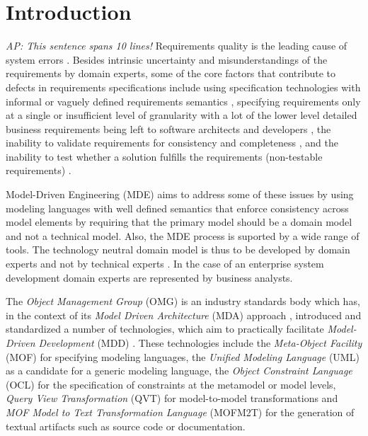 \section{Introduction}

\emph{AP: This sentence spans 10 lines!}
Requirements quality is the leading cause of system errors \cite{heck_experiences_2008}. Besides intrinsic uncertainty and misunderstandings of the requirements by domain experts, some of the core factors that contribute to defects in requirements specifications include using specification technologies with informal or vaguely defined requirements semantics \cite{ferguson_empirical_2006}, specifying requirements only at a single or insufficient level of granularity with a lot of the lower level detailed business requirements being left to software architects and developers
\cite{espana_evaluating_2009,getBetterReference}, the inability to validate requirements for consistency and completeness \cite{somebodyPleaseFindASuitableReference}, and the inability to test whether a solution fulfills the requirements (non-testable requirements) \cite{bashardoust-tajali_extracting_2008}.

Model-Driven Engineering (MDE) \cite{} aims to address some of these issues by using modeling languages with well defined semantics that enforce consistency across model elements by requiring that the primary model should be a domain model and not a technical model\cite{asnina_computation_2010}. Also, the MDE process is suported by a wide range of tools. The technology neutral domain model is thus to be developed by domain experts and not by technical experts \cite{asnina_computation_2010}. In the case of an enterprise system development domain experts are represented by business analysts.

The {\em Object Management Group} (OMG) \cite{} is an industry standards body which has, in the context of its {\em Model Driven Architecture} (MDA) approach \cite{siegel_developing_2001}, introduced and standardized a number of technologies, which aim to practically facilitate {\em Model-Driven Development} (MDD) \cite{}. These technologies include the {\em Meta-Object Facility} (MOF) \cite{} for specifying modeling languages, the {\em Unified Modeling Language} (UML) \cite{} as a candidate for a generic modeling language, the {\em Object Constraint Language} (OCL) for the specification of constraints at the metamodel or model levels, {\em Query View Transformation} (QVT) for model-to-model transformations and {\em MOF Model to Text Transformation Language} (MOFM2T) for the generation of textual artifacts such as source code or documentation.

